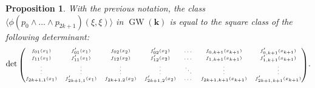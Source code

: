 \documentclass[12pt]{amsart}
\newcounter{thmcounter}
\numberwithin{equation}{section}
\numberwithin{thmcounter}{section}
\newtheorem{proposition}[thmcounter]{Proposition}
\theoremstyle{definition}
\theoremstyle{claim}
\newcommand{\kk}{\mathbf{k}}
\DeclareMathOperator{\GW}{GW}
\begin{document}
\begin{proposition}\label{prop:localdegree}
	With the previous notation, the class $\langle \phi(p_0\wedge \dots \wedge p_{2k+1})(\xi,\xi) \rangle$ in $\GW(\kk)$ is equal to the square class of the following determinant:
    \begin{equation}\label{eq:localdeterminant}
       \det\text{\tiny\(
        \begin{pmatrix}
		f_{01}(x_1) & f'_{01}(x_1) & f_{02}(x_2) & f'_{02}(x_2)& \dots & f_{0,k+1}(x_{k+1}) & f'_{0,k+1}(x_{k+1}) \\
		f_{11}(x_1) & f'_{11}(x_1) & f_{12}(x_2) & f'_{12}(x_2)& \dots & f_{1,k+1}(x_{k+1}) & f'_{1,k+1}(x_{k+1}) \\
		\vdots & \vdots & \vdots & \vdots & \ddots & \vdots & \vdots \\
		f_{2k+1,1}(x_1) & f'_{2k+1,1}(x_1) & f_{2k+1,2}(x_2) & f'_{2k+1,2}(x_2)& \dots & f_{2k+1,k+1}(x_{k+1}) & f'_{2k+1,k+1}(x_{k+1})
	\end{pmatrix}\)}.
	\end{equation}
\end{proposition}
\end{document}
